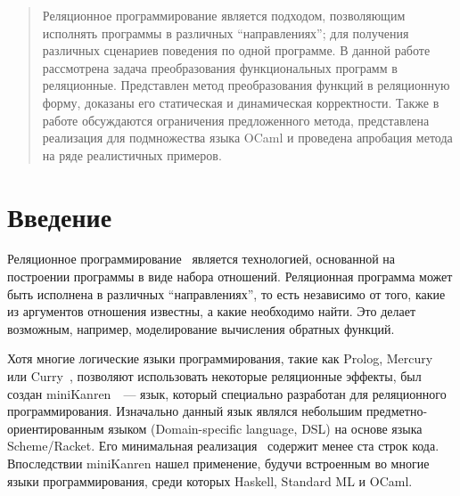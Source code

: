 
\author{Лозов Петр Алексеевич}



\maketitle

\begin{abstract}
Реляционное программирование является подходом, позволяющим исполнять программы в различных ``направлениях''; для получения различных сценариев поведения по одной программе.
В данной работе рассмотрена задача преобразования функциональных программ в реляционные.
Представлен метод преобразования функций в реляционную форму, доказаны его статическая и динамическая корректности.
Также в работе обсуждаются ограничения предложенного метода, представлена реализация для подмножества языка OCaml и проведена апробация метода на ряде реалистичных примеров.
\end{abstract}

\section{Введение}
Реляционное программирование~\cite{lozov-spbu:TheReasonedSchemer} является технологией, основанной на построении программы в виде набора отношений. Реляционная программа может быть исполнена в различных  ``направлениях'', то есть независимо от того, какие из аргументов отношения известны, а какие необходимо найти. Это делает возможным, например, моделирование вычисления обратных функций.

Хотя многие логические языки программирования, такие как Prolog, Mercury~\cite{lozov-spbu:Mercury} или Curry~\cite{lozov-spbu:Curry}, позволяют использовать некоторые реляционные эффекты, был создан miniKanren~\cite{lozov-spbu:mkanren}~--- язык, который специально разработан для реляционного программирования. Изначально данный язык являлся небольшим предметно-ориентированным языком (Domain-specific language, DSL) на основе языка Scheme/Racket. Его минимальная реализация~\cite{lozov-spbu:implementation} содержит менее ста строк кода. Впоследствии miniKanren нашел применение, будучи встроенным во многие языки программирования, среди которых Haskell, Standard ML и OCaml.

